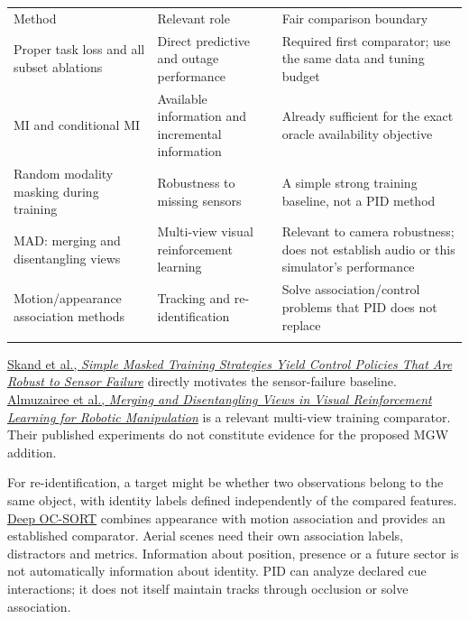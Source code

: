\documentclass[11pt,a4paper]{article}
\newcounter{none}
\begin{document}
{\def\LTcaptype{none} %
\begin{longtable}[]{@{}
  >{\raggedright\arraybackslash}p{}
  >{\raggedright\arraybackslash}p{}
  >{\raggedright\arraybackslash}p{}@{}}
\toprule\noalign{}
\begin{minipage}[b]{\linewidth}\raggedright
Method
\end{minipage} & \begin{minipage}[b]{\linewidth}\raggedright
Relevant role
\end{minipage} & \begin{minipage}[b]{\linewidth}\raggedright
Fair comparison boundary
\end{minipage} \\*
\midrule\noalign{}
\endhead
\bottomrule\noalign{}
\endfoot
Proper task loss and all subset ablations & Direct predictive and outage performance & Required first comparator; use the same data and tuning budget \\*
MI and conditional MI & Available information and incremental information & Already sufficient for the exact oracle availability objective \\*
Random modality masking during training & Robustness to missing sensors & A simple strong training baseline, not a PID method \\*
MAD: merging and disentangling views & Multi-view visual reinforcement learning & Relevant to camera robustness; does not establish audio or this simulator's performance \\*
Motion/appearance association methods & Tracking and re-identification & Solve association/control problems that PID does not replace \\*
\end{longtable}
}

\href{https://proceedings.mlr.press/v270/skand25a.html}{Skand et al., \emph{Simple Masked Training Strategies Yield Control Policies That Are Robust to Sensor Failure}} directly motivates the sensor-failure baseline. \href{https://proceedings.mlr.press/v305/almuzairee25a.html}{Almuzairee et al., \emph{Merging and Disentangling Views in Visual Reinforcement Learning for Robotic Manipulation}} is a relevant multi-view training comparator. Their published experiments do not constitute evidence for the proposed MGW addition.

For re-identification, a target might be whether two observations belong to the same object, with identity labels defined independently of the compared features. \href{https://arxiv.org/abs/2302.11813}{Deep OC-SORT} combines appearance with motion association and provides an established comparator. Aerial scenes need their own association labels, distractors and metrics. Information about position, presence or a future sector is not automatically information about identity. PID can analyze declared cue interactions; it does not itself maintain tracks through occlusion or solve association.
\end{document}
